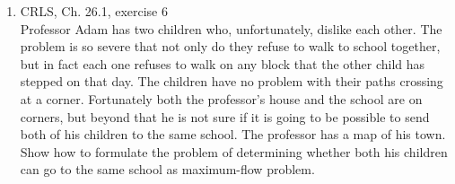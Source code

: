 \documentclass[11pt,dvipsnames]{article}
\theoremstyle{remark}
\begin{document}
\begin{enumerate}
\newpage
\item CRLS, Ch. 26.1, exercise 6\\
Professor Adam has two children who, unfortunately, dislike each other. The problem
is so severe that not only do they refuse to walk to school together, but in fact
each one refuses to walk on any block that the other child has stepped on that day.
The children have no problem with their paths crossing at a corner. Fortunately
both the professor's house and the school are on corners, but beyond that he is not
sure if it is going to be possible to send both of his children to the same school.
The professor has a map of his town. Show how to formulate the problem of determining
whether both his children can go to the same school as maximum-flow problem.
\end{enumerate}
\end{document}
